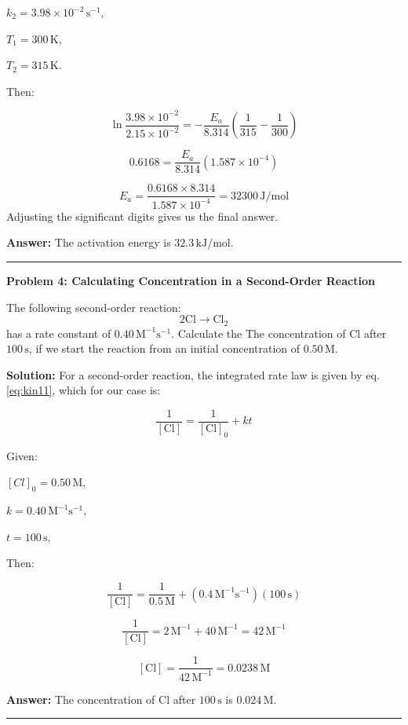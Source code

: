 \documentclass[
  9pt,
]{extbook}
\theoremstyle{definition}
\theoremstyle{definition}
\theoremstyle{definition}
\theoremstyle{definition}
\theoremstyle{remark}
\begin{document}
\(k_2 = 3.98 \times 10^{-2}\,\text{s}^{-1}\),

\(T_1 = 300\,\text{K}\),

\(T_2 = 315\,\text{K}\).

Then:

\[\ln \frac{3.98 \times 10^{-2}}{2.15 \times 10^{-2}} = -\frac{E_a}{8.314}\left(\frac{1}{315} - \frac{1}{300}\right)\]

\[0.6168 = \frac{E_a}{8.314}(1.587 \times 10^{-4})\]

\[E_a = \frac{0.6168 \times 8.314}{1.587 \times 10^{-4}} = 32300\,\text{J/mol}\]
Adjusting the significant digits gives us the final answer.

\textbf{Answer:} The activation energy is \(32.3\,\text{kJ/mol}\).

\begin{center}\rule{0.5\linewidth}{0.5pt}\end{center}

\textbf{Problem 4: Calculating Concentration in a Second-Order Reaction}

The following second-order reaction:
\[2\text{Cl} \rightarrow \text{Cl}_2\]
has a rate constant of \(0.40\,\text{M}^{-1}\text{s}^{-1}\). Calculate the The concentration of \(\text{Cl}\) after \(100\,\text{s}\), if we start the reaction from an initial concentration of \(0.50\,\text{M}\).

\textbf{Solution:} For a second-order reaction, the integrated rate law is given by eq. \eqref{eq:kin11}, which for our case is:

\[\frac{1}{[\text{Cl}]} = \frac{1}{[\text{Cl}]_0} + kt\]

Given:

\([Cl]_0 = 0.50\,\text{M}\),

\(k = 0.40\,\text{M}^{-1}\text{s}^{-1}\),

\(t = 100\,\text{s}\),

Then:

\[\frac{1}{[\text{Cl}]} = \frac{1}{0.5\,\text{M}} + (0.4\,\text{M}^{-1}\text{s}^{-1})(100\,\text{s})\]

\[\frac{1}{[\text{Cl}]} = 2\,\text{M}^{-1} + 40\,\text{M}^{-1} = 42\,\text{M}^{-1}\]

\[[\text{Cl}] = \frac{1}{42\,\text{M}^{-1}} = 0.0238\,\text{M}\]

\textbf{Answer:} The concentration of \(\text{Cl}\) after \(100\,\text{s}\) is \(0.024\,\text{M}\).

\begin{center}\rule{0.5\linewidth}{0.5pt}\end{center}
\end{document}

